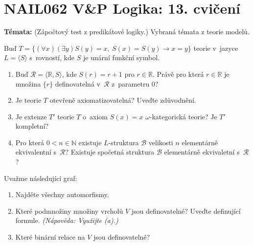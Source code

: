 \documentclass[a4paper,12pt]{article}
\begin{document}
\section*{NAIL062 V\&P Logika: 13. cvičení}

\textbf{Témata:}
(Zápočtový test z predikátové logiky.) Vybraná témata z teorie modelů.


\medskip\begin{problem}
    Buď $T=\{(\forall x)(\exists y) S(y)=x,\ S(x)=S(y)\to x=y\}$ teorie v~jazyce $L=\langle S\rangle$ s~rovností, kde $S$ je unární funkční symbol.
    \begin{enumerate}
    \item Buď $\mathcal{R}=\langle\mathbb{R},S\rangle$, kde $S(r)=r+1$ pro $r\in\mathbb{R}$. Právě pro která $r\in\mathbb{R}$ je množina $\{r\}$ definovatelná v~$\mathcal{R}$ z~parametru $0$?
    \item Je teorie $T$ otevřeně axiomatizovatelná? Uveďte zdůvodnění.
    \item Je extenze $T'$ teorie $T$ o~axiom $S(x)=x$ $\omega$-kategorická teorie? Je $T'$ kompletní?
    \item Pro která $0<n\in\mathbb{N}$ existuje $L$-struktura $\mathcal{B}$ velikosti $n$ elementárně ekvivalentní s~$\mathcal{R}$? Existuje spočetná struktura $\mathcal{B}$ elementárně ekvivaletní s~$\mathcal{R}$?
    \end{enumerate}
\end{problem}


\medskip\begin{problem}
Uvažme následující graf:
\begin{center}
\end{center}
\begin{enumerate}
    \item Najděte všechny automorfismy.
    \item Které podmnožiny množiny vrcholů $V$ jsou definovatelné? Uveďte definující formule. {\it (Nápověda: Využijte (a).)}
    \item Které binární relace na $V$ jsou definovatelné?
\end{enumerate}
\end{problem}
\end{document}
